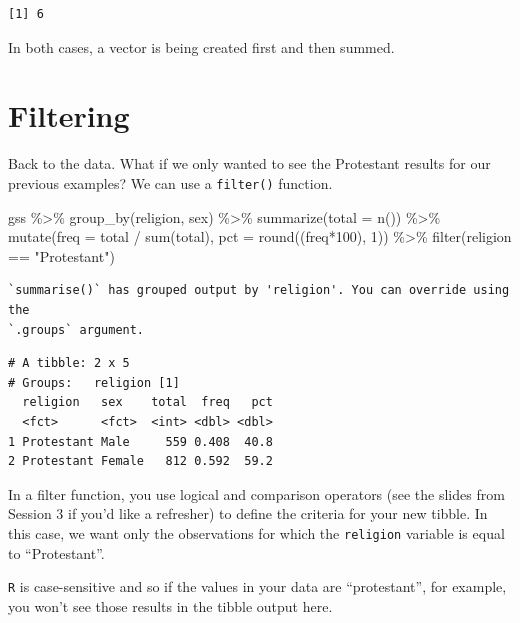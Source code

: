 \documentclass[
  letterpaper,
]{book}
\newenvironment{Shaded}{\begin{snugshade}}{\end{snugshade}}
\newcommand{\AttributeTok}[1]{\textcolor[rgb]{0.40,0.45,0.13}{#1}}
\newcommand{\DecValTok}[1]{\textcolor[rgb]{0.68,0.00,0.00}{#1}}
\newcommand{\FunctionTok}[1]{\textcolor[rgb]{0.28,0.35,0.67}{#1}}
\newcommand{\NormalTok}[1]{\textcolor[rgb]{0.00,0.23,0.31}{#1}}
\newcommand{\SpecialCharTok}[1]{\textcolor[rgb]{0.37,0.37,0.37}{#1}}
\newcommand{\StringTok}[1]{\textcolor[rgb]{0.13,0.47,0.30}{#1}}
\begin{document}
\begin{verbatim}
[1] 6
\end{verbatim}

In both cases, a vector is being created first and then summed.

\hypertarget{filtering}{%
\section{Filtering}\label{filtering}}

Back to the data. What if we only wanted to see the Protestant results
for our previous examples? We can use a \texttt{filter()} function.

\begin{Shaded}
\begin{Highlighting}[]
\NormalTok{gss }\SpecialCharTok{\%\textgreater{}\%}
  \FunctionTok{group\_by}\NormalTok{(religion, sex) }\SpecialCharTok{\%\textgreater{}\%}
  \FunctionTok{summarize}\NormalTok{(}\AttributeTok{total =} \FunctionTok{n}\NormalTok{()) }\SpecialCharTok{\%\textgreater{}\%}
  \FunctionTok{mutate}\NormalTok{(}\AttributeTok{freq =}\NormalTok{ total }\SpecialCharTok{/} \FunctionTok{sum}\NormalTok{(total),}
         \AttributeTok{pct =} \FunctionTok{round}\NormalTok{((freq}\SpecialCharTok{*}\DecValTok{100}\NormalTok{), }\DecValTok{1}\NormalTok{)) }\SpecialCharTok{\%\textgreater{}\%}
  \FunctionTok{filter}\NormalTok{(religion }\SpecialCharTok{==} \StringTok{"Protestant"}\NormalTok{)}
\end{Highlighting}
\end{Shaded}

\begin{verbatim}
`summarise()` has grouped output by 'religion'. You can override using the
`.groups` argument.
\end{verbatim}

\begin{verbatim}
# A tibble: 2 x 5
# Groups:   religion [1]
  religion   sex    total  freq   pct
  <fct>      <fct>  <int> <dbl> <dbl>
1 Protestant Male     559 0.408  40.8
2 Protestant Female   812 0.592  59.2
\end{verbatim}

In a filter function, you use logical and comparison operators (see the
slides from Session 3 if you'd like a refresher) to define the criteria
for your new tibble. In this case, we want only the observations for
which the \texttt{religion} variable is equal to ``Protestant''.

\texttt{R} is case-sensitive and so if the values in your data are
``protestant'', for example, you won't see those results in the tibble
output here.
\end{document}
